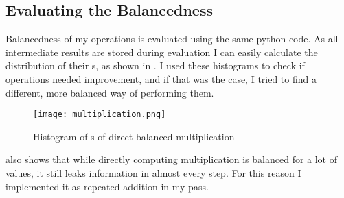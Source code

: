 \subsection{Evaluating the Balancedness}
\label{balance-eval}
Balancedness of my operations is evaluated using the same python code.
As all intermediate results are stored during evaluation I can easily calculate the distribution of their \hammingw s, as shown in .
I used these histograms to check if operations needed improvement, and if that was the case, I tried to find a different, more balanced way of performing them.

\begin{figure}[h]
  \centering
  \texttt{[image: multiplication.png]}
  \caption{Histogram of \hammingw s of direct balanced multiplication}
  \label{fig:mult}
\end{figure}

 also shows that while directly computing multiplication is balanced for a lot of values, it still leaks information in almost every step.
For this reason I implemented it as repeated addition in my pass.
